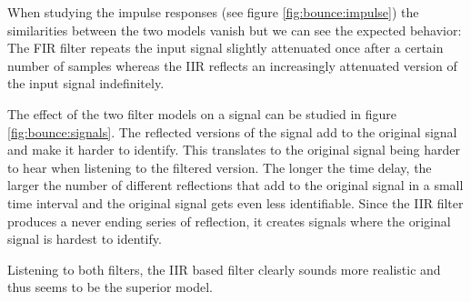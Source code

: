 \documentclass[journal]{IEEEtran}
\begin{document}
When studying the impulse responses (see figure \ref{fig:bounce:impulse}) the similarities between the two models vanish but we can see the expected behavior: The FIR filter repeats the input signal slightly attenuated once after a certain number of samples whereas the IIR reflects an increasingly attenuated version of the input signal indefinitely.

The effect of the two filter models on a signal can be studied in figure \ref{fig:bounce:signals}. The reflected versions of the signal add to the original signal and make it harder to identify. This translates to the original signal being harder to hear when listening to the filtered version. The longer the time delay, the larger the number of different reflections that add to the original signal in a small time interval and the original signal gets even less identifiable. Since the IIR filter produces a never ending series of reflection, it creates signals where the original signal is hardest to identify.

Listening to both filters, the IIR based filter clearly sounds more realistic and thus seems to be the superior model.
\end{document}
